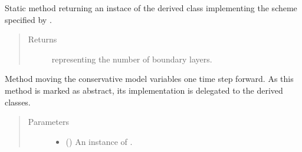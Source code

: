 \documentclass[letterpaper,10pt,english]{sphinxmanual}
\begin{document}
\begin{fulllineitems}

\begin{fulllineitems}
\label{\detokenize{api:dycore.isentropic_prognostic.IsentropicPrognostic.factory}}
Static method returning an instace of the derived class implementing the scheme specified by
.

\end{fulllineitems}


\begin{fulllineitems}
\label{\detokenize{api:dycore.isentropic_prognostic.IsentropicPrognostic.nb}}
 \textendash{}
\begin{quote}\begin{description}
\item[{Returns}] \leavevmode
{} representing the number of boundary layers.

\end{description}\end{quote}

\end{fulllineitems}


\begin{fulllineitems}
\label{\detokenize{api:dycore.isentropic_prognostic.IsentropicPrognostic.step_forward}}
Method moving the conservative model variables one time step forward.
As this method is marked as abstract, its implementation is delegated to the derived classes.
\begin{quote}\begin{description}
\item[{Parameters}] \leavevmode\begin{itemize}
\item {} 
 () \textendash{} An instance of {\hyperref[\detokenize{api:dycore.isentropic_diagnostic.IsentropicDiagnostic}]{}}.


\end{itemize}
\end{description}
\end{quote}
\end{fulllineitems}
\end{fulllineitems}
\end{document}
